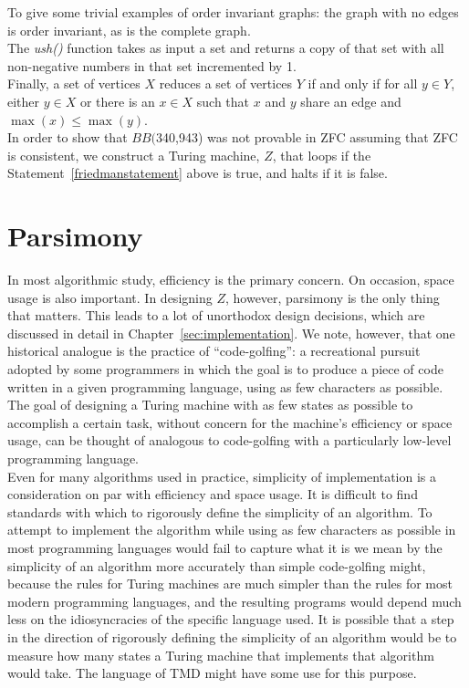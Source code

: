 \documentclass[11pt]{report}
\newcommand{\bbstatenum}{$BB($340,943) }
\begin{document}
To give some trivial examples of order invariant graphs: the graph with no edges is order invariant, as is the complete graph. \\ %

The \emph{ush()} function takes as input a set and returns a copy of that set with all non-negative numbers in that set incremented by 1. \\ 

Finally, a set of vertices $X$ reduces a set of vertices $Y$ if and only if for all $y \in Y$, either $y \in X$ or there is an $x \in X$ such that $x$ and $y$ share an edge and $\max(x) \le \max(y)$. \\

In order to show that \bbstatenum was not provable in ZFC assuming that ZFC is consistent, we construct a Turing machine, $Z$, that loops if the Statement~\ref{friedmanstatement} above is true, and halts if it is false. 

\section{Parsimony}

In most algorithmic study, efficiency is the primary concern. On occasion, space usage is also important. In designing $Z$, however, parsimony is the only thing that matters. This leads to a lot of unorthodox design decisions, which are discussed in detail in Chapter~\ref{sec:implementation}. We note, however, that one historical analogue is the practice of ``code-golfing'': a recreational pursuit adopted by some programmers in which the goal is to produce a piece of code written in a given programming language, using as few characters as possible. %
The goal of designing a Turing machine with as few states as possible to accomplish a certain task, without concern for the machine's efficiency or space usage, can be thought of analogous to code-golfing with a particularly low-level programming language. \\

Even for many algorithms used in practice, simplicity of implementation is a consideration on par with efficiency and space usage. It is difficult to find standards with which to rigorously define the simplicity of an algorithm. To attempt to implement the algorithm while using as few characters as possible in most programming languages would fail to capture what it is we mean by the simplicity of an algorithm more accurately than simple code-golfing might, because the rules for Turing machines are much simpler than the rules for most modern programming languages, and the resulting programs would depend much less on the idiosyncracies of the specific language used. It is possible that a step in the direction of rigorously defining the simplicity of an algorithm would be to measure how many states a Turing machine that implements that algorithm would take. The language of TMD might have some use for this purpose.
\end{document}
